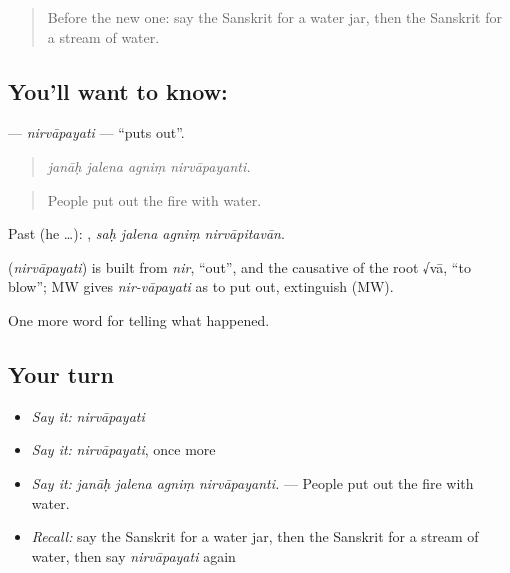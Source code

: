 \begin{quote}
Before the new one: say the Sanskrit for a water jar, then the Sanskrit for a stream of water.
\end{quote}

\subsection*{You'll want to know: }
\textbf{} — \emph{nirvāpayati} — \textquotedblleft{}puts out\textquotedblright{}.

\begin{quote}
   
\end{quote}

\begin{quote}
\emph{janāḥ jalena agniṃ nirvāpayanti.}
\end{quote}

\begin{quote}
People put out the fire with water.
\end{quote}

Past (he …):    , \emph{saḥ jalena agniṃ nirvāpitavān}.

\begin{cousinweb}
\textbf{} (\emph{nirvāpayati}) is built from \emph{nir}, \textquotedblleft{}out\textquotedblright{}, and the causative of the root √vā, \textquotedblleft{}to blow\textquotedblright{}; MW gives \emph{nir-vāpayati} as to put out, extinguish (MW).
\end{cousinweb}

\begin{grammarlens}[title={What you've built}]
One more word for telling what happened.
\end{grammarlens}

\subsection*{Your turn}
\begin{itemize}
\raggedright
  \item \emph{Say it:} \emph{nirvāpayati}
  \item \emph{Say it:} \emph{nirvāpayati}, once more
  \item \emph{Say it:} \emph{janāḥ jalena agniṃ nirvāpayanti.} — People put out the fire with water.
  \item \emph{Recall:} say the Sanskrit for a water jar, then the Sanskrit for a stream of water, then say \emph{nirvāpayati} again
\end{itemize}

